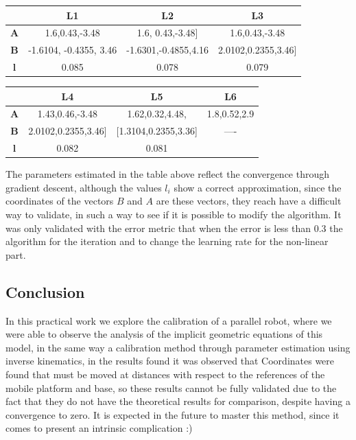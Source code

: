\documentclass[12pt, twoside]{report}
\begin{document}
\begin{table}[H]
\begin{tabular}{|c|c|c|c|}
\hline
\textbf{}  & \textbf{L1} & \textbf{L2} & \textbf{L3} \\ \hline
\textbf{A}&     1.6,0.43,-3.48       & 1.6, 0.43,-3.48]            &  1.6,0.43,-3.48             \\ \hline
\textbf{B}& -1.6104, -0.4355, 3.46            &     -1.6301,-0.4855,4.16        & 2.0102,0.2355,3.46]                \\ \hline
\textbf{l} &      0.085       &    0.078         &     0.079             \\ \hline
\end{tabular}
\end{table}

\begin{table}[H]
\begin{tabular}{|c|c|c|c|}
\hline
\textbf{}  & \textbf{L4} & \textbf{L5} & \textbf{L6} \\ \hline
\textbf{A} &       1.43,0.46,-3.48      &   1.62,0.32,4.48,         &       1.8,0.52,2.9               \\ \hline
\textbf{B} & 2.0102,0.2355,3.46]            &  [1.3104,0.2355,3.36]           &      ----           \\ \hline
\textbf{l} &  0.082           & 0.081            &                         \\ \hline
\end{tabular}
\end{table}


The parameters estimated in the table above reflect the convergence through gradient descent, although the values $l_i$ show a correct approximation, since the coordinates of the vectors $B$ and $A$ are these vectors, they reach have a difficult way to validate, in such a way to see if it is possible to modify the algorithm. It was only validated with the error metric that when the error is less than 0.3 the algorithm for the iteration and to change the learning rate for the non-linear part.

\subsection{Conclusion}
In this practical work we explore the calibration of a parallel robot, where we were able to observe the analysis of the implicit geometric equations of this model, in the same way a calibration method through parameter estimation using inverse kinematics, in the results found it was observed that Coordinates were found that must be moved at distances with respect to the references of the mobile platform and base, so these results cannot be fully validated due to the fact that they do not have the theoretical results for comparison, despite having a convergence to zero. It is expected in the future to master this method, since it comes to present an intrinsic complication :)

    
\end{document}
